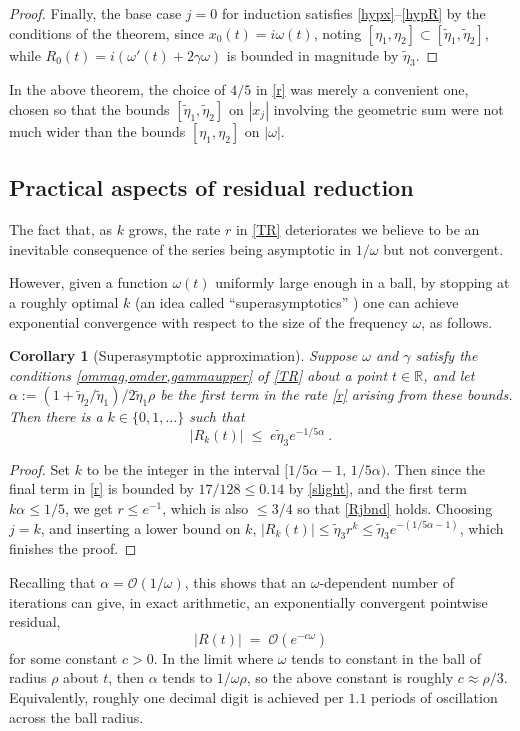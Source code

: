 \documentclass[10pt]{article}
\newcommand{\R}{\mathbb{R}}
\newcommand{\bigO}{{\mathcal O}}
\newtheorem{cor}[thm]{Corollary}
\newcommand{\om}{\omega}
\newcommand{\g}{\gamma}
\newcommand{\te}{\tilde\eta}
\begin{document}
\begin{proof}
Finally, the base case $j=0$ for induction
satisfies \cref{hypx}--\cref{hypR}
by the conditions of the theorem,
since $x_0(t) = i\om(t)$, noting $[\eta_1,\eta_2] \subset [\te_1,\te_2]$,
while $R_0(t) = i\left(\om'(t) + 2\g\om \right)$ is bounded in magnitude by $\te_3$.
\end{proof}

In the above theorem, the choice of $4/5$ in \cref{r} was merely a convenient one, chosen so that the bounds $[\te_1,\te_2]$ on $|x_j|$
involving the geometric sum were
not much wider than the bounds $[\eta_1,\eta_2]$ on $|\om|$.


\subsection{Practical aspects of residual reduction \label{pracres}}

The fact that, as $k$ grows,
the rate $r$ in \cref{TR} deteriorates
we believe to be an inevitable consequence of
the series being asymptotic in $1/\om$ but not convergent.

However, given a function $\om(t)$ uniformly large enough
in a ball,
by stopping at a roughly optimal $k$ (an idea
called ``superasymptotics'' \cite{berrysuper,boydsuper})
one can achieve
exponential convergence with respect to the size of the frequency $\om$,
as follows.

\begin{cor}[Superasymptotic approximation]\label{super}
  Suppose $\om$ and $\g$ satisfy the conditions \cref{ommag,omder,gammaupper}
  of \cref{TR}
  about a point $t\in\R$,
  and let $\alpha := (1+\te_2/\te_1)/2\te_1\rho$ be the
  first term in the rate \cref{r} arising from these bounds.
  Then there is a $k\in\{0,1,\dots\}$ such that
  $$
  |R_k(t)| \; \le \; e \te_3 e^{-1/5\alpha}~.
  $$
\end{cor}
\begin{proof}
  Set $k$ to be the integer in the interval $[1/5\alpha-1, \, 1/5\alpha)$.
    Then since the final term in \cref{r} is bounded by $17/128 \leq 0.14$
    by \cref{slight}, and the
    first term $k\alpha \le 1/5$, we get $r\le e^{-1}$, which
    is also $\le 3/4$ so that \cref{Rjbnd} holds.
    Choosing $j=k$, and inserting a lower bound on $k$,
    $|R_k(t)| \le \te_3 r^k \le \te_3 e^{-(1/5\alpha-1)}$, which
    finishes the proof.
  \end{proof}
Recalling that $\alpha = \bigO(1/\om)$, this
shows that an $\om$-dependent
number of iterations can give, in exact arithmetic, an
exponentially convergent pointwise residual,
$$
|R(t)| \;=\; \bigO(e^{-c\om})
$$
for some constant $c>0$.
In the limit where
$\om$ tends to constant in the ball of radius $\rho$ about $t$, then
$\alpha$ tends to $1/\om\rho$, so the above
constant is roughly $c\approx \rho/3$.
Equivalently, roughly one decimal digit is achieved per
$1.1$ periods of oscillation across the ball radius.
\end{document}
